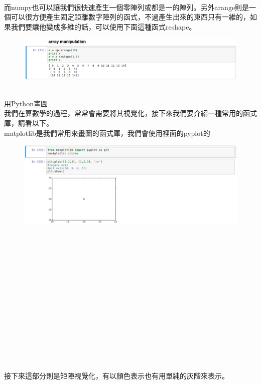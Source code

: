 \documentclass{article}
\begin{document}
\\
而numpy也可以讓我們很快速產生一個零陣列或都是一的陣列。另外arange則是一個可以很方便產生固定距離數字陣列的函式，不過產生出來的東西只有一維的，如果我們要讓他變成多維的話，可以使用下面這種函式reshape。
\
\begin{figure}[htp]
    \begin{center}
        \includegraphics[width=450pt]{pic/3_1_7.png}
    \end{center}
\end{figure}
\\
用Python畫圖
\\我們在算數學的過程，常常會需要將其視覺化，接下來我們要介紹一種常用的函式庫，請看以下。
\\matplotlib是我們常用來畫圖的函式庫，我們會使用裡面的pyplot的
\
\begin{figure}[htp]
    \begin{center}
        \includegraphics[width=450pt]{pic/3_1_8.png}
    \end{center}
\end{figure}
\\\\\\\\\\\\\\\\\\\\\\\\\\\\接下來這部分則是矩陣視覺化，有以顏色表示也有用單純的灰階來表示。
\\
\end{document}
